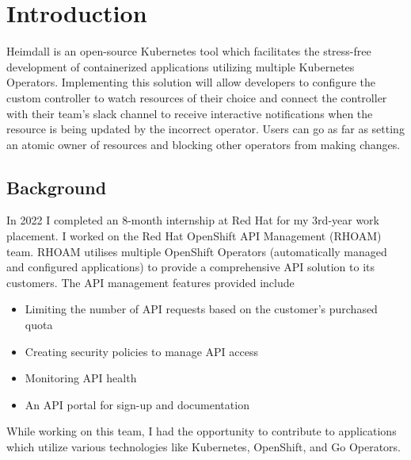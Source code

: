 \documentclass{article}
\begin{document}
\newpage
\section{Introduction}
Heimdall is an open-source Kubernetes tool which facilitates the stress-free development of containerized applications utilizing multiple Kubernetes Operators. Implementing this solution will allow developers to configure the custom controller to watch resources of their choice and connect the controller with their team’s slack channel to receive interactive notifications when the resource is being updated by the incorrect operator. Users can go as far as setting an atomic owner of resources and blocking other operators from making changes.



\subsection{Background}
In 2022 I completed an 8-month internship at Red Hat for my 3rd-year work placement. I worked on the Red Hat OpenShift API Management (RHOAM) team. RHOAM utilises multiple OpenShift Operators (automatically managed and configured applications) to provide a comprehensive API solution to its customers. The API management features provided include
\begin{itemize}
    \itemsep0em 
    \item Limiting the number of API requests based on the customer’s purchased quota
    \item Creating security policies to manage API access
    \item Monitoring API health
    \item An API portal for sign-up and documentation
\end{itemize}
While working on this team, I had the opportunity to contribute to applications which utilize various technologies like Kubernetes, OpenShift, and Go Operators.
\end{document}
